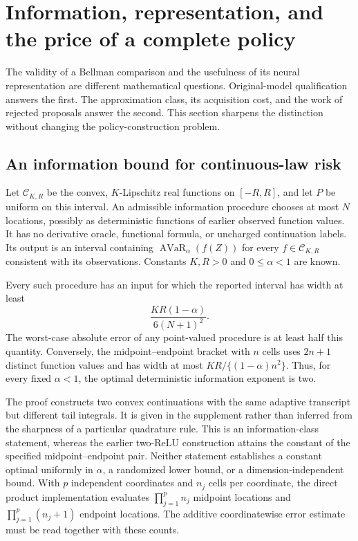 \section{Information, representation, and the price of a complete policy}\label{sec:theory97}
The validity of a Bellman comparison and the usefulness of its neural representation are different mathematical questions. Original-model qualification answers the first. The approximation class, its acquisition cost, and the work of rejected proposals answer the second. This section sharpens the distinction without changing the policy-construction problem.

\subsection{An information bound for continuous-law risk}
Let $\mathcal C_{K,R}$ be the convex, $K$-Lipschitz real functions on $[-R,R]$, and let $P$ be uniform on this interval. An admissible information procedure chooses at most $N$ locations, possibly as deterministic functions of earlier observed function values. It has no derivative oracle, functional formula, or uncharged continuation labels. Its output is an interval containing $\operatorname{AVaR}_\alpha(f(Z))$ for every $f\in\mathcal C_{K,R}$ consistent with its observations. Constants $K,R>0$ and $0\leq\alpha<1$ are known.

\begin{theorem}\label{thm:information97}
Every such procedure has an input for which the reported interval has width at least
\begin{equation}\label{eq:information97}
 \frac{KR(1-\alpha)}{6(N+1)^2}.
\end{equation}
The worst-case absolute error of any point-valued procedure is at least half this quantity. Conversely, the midpoint--endpoint bracket with $n$ cells uses $2n+1$ distinct function values and has width at most $KR/\{(1-\alpha)n^2\}$. Thus, for every fixed $\alpha<1$, the optimal deterministic information exponent is two.
\end{theorem}

The proof constructs two convex continuations with the same adaptive transcript but different tail integrals. It is given in the supplement rather than inferred from the sharpness of a particular quadrature rule. This is an information-class statement, whereas the earlier two-ReLU construction attains the constant of the specified midpoint--endpoint pair. Neither statement establishes a constant optimal uniformly in $\alpha$, a randomized lower bound, or a dimension-independent bound. With $p$ independent coordinates and $n_j$ cells per coordinate, the direct product implementation evaluates $\prod_{j=1}^p n_j$ midpoint locations and $\prod_{j=1}^p(n_j+1)$ endpoint locations. The additive coordinatewise error estimate must be read together with these counts.

